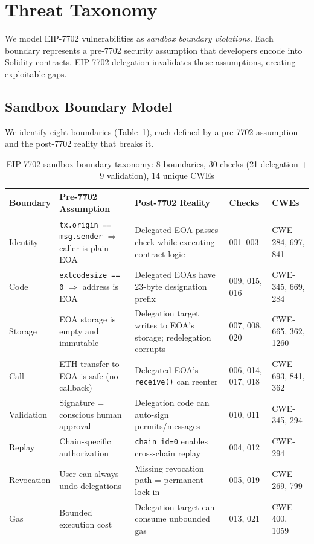 \section{Threat Taxonomy}
\label{sec:threat_model}

We model EIP-7702 vulnerabilities as \textit{sandbox boundary violations}. Each boundary represents a pre-7702 security assumption that developers encode into Solidity contracts. EIP-7702 delegation invalidates these assumptions, creating exploitable gaps.

\subsection{Sandbox Boundary Model}

We identify eight boundaries (Table~\ref{tab:boundaries}), each defined by a pre-7702 assumption and the post-7702 reality that breaks it.

\begin{table}[t]
\centering
\caption{EIP-7702 sandbox boundary taxonomy: 8 boundaries, 30 checks (21 delegation + 9 validation), 14 unique CWEs}
\label{tab:boundaries}
\begin{tabular}{p{1.5cm}p{3.2cm}p{3.2cm}lp{1.8cm}}
\hline
\textbf{Boundary} & \textbf{Pre-7702 Assumption} & \textbf{Post-7702 Reality} & \textbf{Checks} & \textbf{CWEs} \\
\hline
Identity & \texttt{tx.origin == msg.sender} $\Rightarrow$ caller is plain EOA & Delegated EOA passes check while executing contract logic & 001--003 & CWE-284, 697, 841 \\
\hline
Code & \texttt{extcodesize == 0} $\Rightarrow$ address is EOA & Delegated EOAs have 23-byte designation prefix & 009, 015, 016 & CWE-345, 669, 284 \\
\hline
Storage & EOA storage is empty and immutable & Delegation target writes to EOA's storage; redelegation corrupts & 007, 008, 020 & CWE-665, 362, 1260 \\
\hline
Call & ETH transfer to EOA is safe (no callback) & Delegated EOA's \texttt{receive()} can reenter & 006, 014, 017, 018 & CWE-693, 841, 362 \\
\hline
Validation & Signature = conscious human approval & Delegation code can auto-sign permits/messages & 010, 011 & CWE-345, 294 \\
\hline
Replay & Chain-specific authorization & \texttt{chain\_id=0} enables cross-chain replay & 004, 012 & CWE-294 \\
\hline
Revocation & User can always undo delegations & Missing revocation path = permanent lock-in & 005, 019 & CWE-269, 799 \\
\hline
Gas & Bounded execution cost & Delegation target can consume unbounded gas & 013, 021 & CWE-400, 1059 \\
\hline
\end{tabular}
\end{table}

